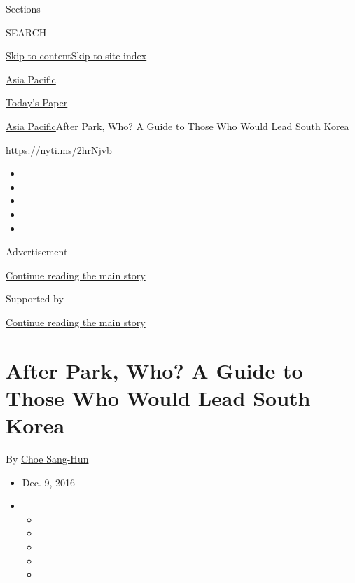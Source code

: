 Sections

SEARCH

\protect\hyperlink{site-content}{Skip to
content}\protect\hyperlink{site-index}{Skip to site index}

\href{https://www.nytimes3xbfgragh.onion/section/world/asia}{Asia
Pacific}

\href{https://myaccount.nytimes3xbfgragh.onion/auth/login?response_type=cookie\&client_id=vi}{}

\href{https://www.nytimes3xbfgragh.onion/section/todayspaper}{Today's
Paper}

\href{/section/world/asia}{Asia Pacific}\textbar{}After Park, Who? A
Guide to Those Who Would Lead South Korea

\url{https://nyti.ms/2hrNjvb}

\begin{itemize}
\item
\item
\item
\item
\item
\end{itemize}

Advertisement

\protect\hyperlink{after-top}{Continue reading the main story}

Supported by

\protect\hyperlink{after-sponsor}{Continue reading the main story}

\hypertarget{after-park-who-a-guide-to-those-who-would-lead-south-korea}{%
\section{After Park, Who? A Guide to Those Who Would Lead South
Korea}\label{after-park-who-a-guide-to-those-who-would-lead-south-korea}}

By \href{http://www.nytimes3xbfgragh.onion/by/choe-sang-hun}{Choe
Sang-Hun}

\begin{itemize}
\item
  Dec. 9, 2016
\item
  \begin{itemize}
  \item
  \item
  \item
  \item
  \item
  \end{itemize}
\end{itemize}

